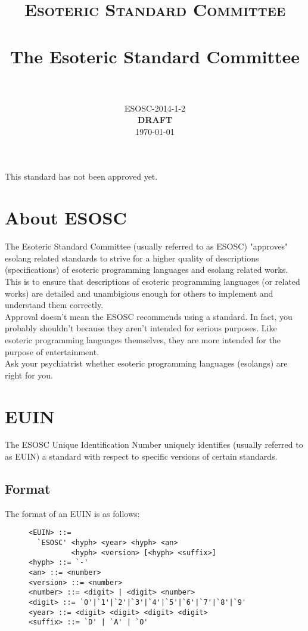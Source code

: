 \documentclass[paper=a4, fontsize=11pt]{scrartcl}
\title{
	\usefont{OT1}{bch}{b}{n}
	\normalfont \normalsize \textsc{Esoteric Standard Committee} \\ [25pt]
	\horrule{0.5pt} \\[0.4cm]
	\huge The Esoteric Standard Committee \\
	\horrule{2pt} \\[0.5cm]
}
\author{
	\normalfont\normalsize
	ESOSC-2014-1-2\\[-3pt]\normalsize
	\textbf{DRAFT}\\
	\today
}
\date{}
\numberwithin{equation}{section}
\numberwithin{figure}{section}
\numberwithin{table}{section}
\begin{document}
\maketitle

\begin{center}
This standard has not been approved yet.
\end{center}

\section{About ESOSC}

The Esoteric Standard Committee (usually referred to as ESOSC) "approves" esolang
related standards to strive for a higher quality of descriptions (specifications)
of esoteric programming languages and esolang related works. This is to ensure 
that descriptions of esoteric programming languages (or related works) are 
detailed and unambigious enough for others to implement and understand them 
correctly. \\


Approval doesn't mean the ESOSC recommends using a standard. In fact,
you probably shouldn't because they aren't intended for serious purposes. Like
esoteric programming languages themselves, they are more intended for the
purpose of entertainment. \\


Ask your psychiatrist whether esoteric programming languages (esolangs) are
right for you. 


\section{EUIN}

The ESOSC Unique Identification Number uniquely identifies (usually referred to
as EUIN) a standard with respect to specific versions of certain standards.  


\subsection{Format}

The format of an EUIN is as follows:  

\begin{figure}
\begin{verbatim}
<EUIN> ::= 
  `ESOSC' <hyph> <year> <hyph> <an> 
          <hyph> <version> [<hyph> <suffix>]
<hyph> ::= `-' 
<an> ::= <number>
<version> ::= <number>
<number> ::= <digit> | <digit> <number> 
<digit> ::= `0'|`1'|`2'|`3'|`4'|`5'|`6'|`7'|`8'|`9' 
<year> ::= <digit> <digit> <digit> <digit> 
<suffix> ::= `D' | `A' | `O'
\end{verbatim}
\end{figure}
	
\end{document}
